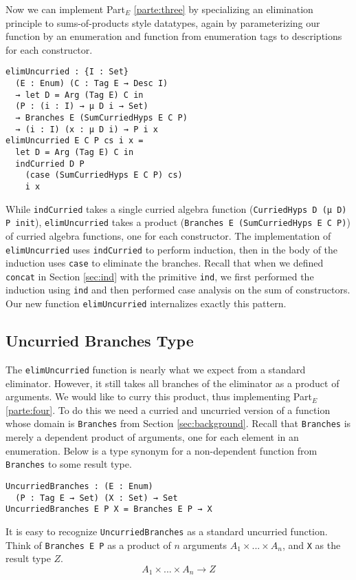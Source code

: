 \documentclass[preprint,nonatbib]{sigplanconf}
\newcommand{\refsec}[1]{Section \ref{sec:#1}}
\newcommand{\refparte}[1]{Part$_E$ \ref{parte:#1}}
\begin{document}
Now we can implement \refparte{three} by specializing an elimination
principle to sums-of-products style datatypes, again by parameterizing
our function by an enumeration and function from enumeration tags to
descriptions for each constructor.

\begin{verbatim}
elimUncurried : {I : Set} 
  (E : Enum) (C : Tag E → Desc I)
  → let D = Arg (Tag E) C in
  (P : (i : I) → μ D i → Set)
  → Branches E (SumCurriedHyps E C P)
  → (i : I) (x : μ D i) → P i x
elimUncurried E C P cs i x =
  let D = Arg (Tag E) C in
  indCurried D P
    (case (SumCurriedHyps E C P) cs)
    i x
\end{verbatim}

While {\tt indCurried} takes a single curried algebra function
({\tt CurriedHyps D (μ D) P init}), {\tt elimUncurried} takes a
product ({\tt Branches E (SumCurriedHyps E C P)})
of curried algebra functions, one for each constructor. The
implementation of {\tt elimUncurried} uses {\tt indCurried} to perform
induction, then in the body of the induction uses {\tt case} to
eliminate the branches. Recall that when we defined {\tt concat} in
\refsec{ind} with the primitive {\tt ind}, we first performed the
induction using {\tt ind} and then performed case analysis on the sum
of constructors. Our new function {\tt elimUncurried} internalizes
exactly this pattern.

\subsection{Uncurried Branches Type}

The {\tt elimUncurried} function is nearly what we expect from a
standard eliminator. However, it still takes all branches of the
eliminator as a product of arguments. We would like to curry this
product, thus implementing \refparte{four}.
To do this we need a curried and uncurried
version of a function whose domain is {\tt Branches}
from \refsec{background}. Recall that {\tt Branches} is merely a
dependent product of arguments, one for each element in an
enumeration. Below is a type synonym for a non-dependent function from
{\tt Branches} to some result type.

\begin{verbatim}
UncurriedBranches : (E : Enum)
  (P : Tag E → Set) (X : Set) → Set
UncurriedBranches E P X = Branches E P → X
\end{verbatim}

It is easy to recognize {\tt UncurriedBranches} as a standard
uncurried function. Think of {\tt Branches E P} as a product of
$n$ arguments $A_1 × ... × A_n$, 
and {\tt X} as the result type $Z$.
\[
A_1 × ... × A_n → Z
\]
\end{document}
